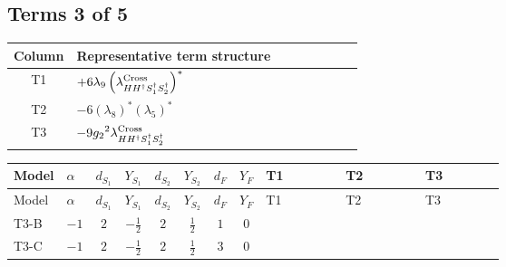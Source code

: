 \documentclass[8pt]{article}
\begin{document}
\begin{landscape}
\subsection*{Terms 3 of 5}
\begin{center}
\begin{tabular}{@{}c >{\raggedright\arraybackslash}p{0.82\linewidth}@{}}
\toprule
Column & Representative term structure \\
\midrule
T1 & \(\displaystyle +6 {\lambda_{9}} \left({\lambda_{H H^\dagger S_1^\dagger S_2^\dagger}^{\rm Cross}}\right)^{*}\) \\
\midrule
T2 & \(\displaystyle -6 \left({\lambda_{8}}\right)^{*} \left({\lambda_5}\right)^{*}\) \\
\midrule
T3 & \(\displaystyle -9 {g_2}^2 {\lambda_{H H^\dagger S_1^\dagger S_2^\dagger}^{\rm Cross}}\) \\
\midrule
\bottomrule
\end{tabular}
\end{center}
\smallskip
\tiny
\begin{longtable}{@{}llcccccc >{\raggedright\arraybackslash}p{0.21\linewidth} >{\raggedright\arraybackslash}p{0.21\linewidth} >{\raggedright\arraybackslash}p{0.21\linewidth}@{}}
\toprule
Model & $\alpha$ & $d_{S_1}$ & $Y_{S_1}$ & $d_{S_2}$ & $Y_{S_2}$ & $d_F$ & $Y_F$ & T1 & T2 & T3 \\
\midrule
\endfirsthead
\toprule
Model & $\alpha$ & $d_{S_1}$ & $Y_{S_1}$ & $d_{S_2}$ & $Y_{S_2}$ & $d_F$ & $Y_F$ & T1 & T2 & T3 \\
\midrule
\endhead
T3-B & $-1$ & $2$ & $-\frac{1}{2}$ & $2$ & $\frac{1}{2}$ & $1$ & $0$ & \scriptsize\adjustbox{max width=\linewidth}{$\begin{gathered} +6 {\lambda_{9}} \left({\lambda_{H H^\dagger S_1^\dagger S_2^\dagger}^{\rm Cross}}\right)^{*}\end{gathered}$} & \scriptsize\adjustbox{max width=\linewidth}{$\begin{gathered} -6 \left({\lambda_{8}}\right)^{*} \left({\lambda_5}\right)^{*}\end{gathered}$} & \scriptsize\adjustbox{max width=\linewidth}{$\begin{gathered} -9 {g_2}^2 {\lambda_{H H^\dagger S_1^\dagger S_2^\dagger}^{\rm Cross}}\end{gathered}$} \\
\midrule
T3-C & $-1$ & $2$ & $-\frac{1}{2}$ & $2$ & $\frac{1}{2}$ & $3$ & $0$ & \scriptsize\adjustbox{max width=\linewidth}{$\begin{gathered} +6 {\lambda_{9}} \left({\lambda_{H H^\dagger S_1^\dagger S_2^\dagger}^{\rm Cross}}\right)^{*}\end{gathered}$} & \scriptsize\adjustbox{max width=\linewidth}{$\begin{gathered} -6 \left({\lambda_{8}}\right)^{*} \left({\lambda_5}\right)^{*}\end{gathered}$} & \scriptsize\adjustbox{max width=\linewidth}{$\begin{gathered} -9 {g_2}^2 {\lambda_{H H^\dagger S_1^\dagger S_2^\dagger}^{\rm Cross}}\end{gathered}$} \\

\end{longtable}
\end{landscape}
\end{document}

